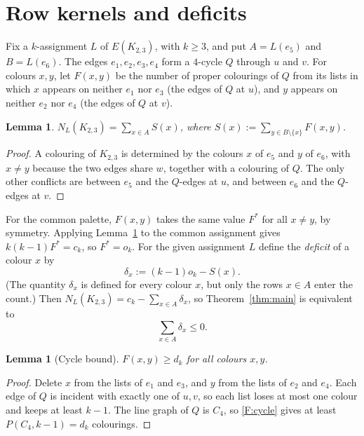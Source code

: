 \documentclass[11pt]{amsart}
\newtheorem{lemma}[theorem]{Lemma}
\theoremstyle{definition}
\theoremstyle{remark}
\newcommand{\1}{\mathbf 1}
\begin{document}
\section{Row kernels and deficits}\label{sec:reduction}

Fix a $k$-assignment $L$ of $E(K_{2,3})$, with $k\ge3$, and put $A=L(e_5)$ and $B=L(e_6)$. The edges
$e_1,e_2,e_3,e_4$ form a $4$-cycle $Q$ through $u$ and $v$. For colours $x,y$, let $F(x,y)$ be the
number of proper colourings of $Q$ from its lists in which $x$ appears on neither $e_1$ nor $e_3$ (the
edges of $Q$ at $u$), and $y$ appears on neither $e_2$ nor $e_4$ (the edges of $Q$ at $v$).

\begin{lemma}\label{lem:glue}
$N_L(K_{2,3})=\sum_{x\in A}S(x)$, where $S(x):=\sum_{y\in B\setminus\{x\}}F(x,y)$.
\end{lemma}
\begin{proof}
A colouring of $K_{2,3}$ is determined by the colours $x$ of $e_5$ and $y$ of $e_6$, with $x\neq y$
because the two edges share $w$, together with a colouring of $Q$. The only other conflicts are between
$e_5$ and the $Q$-edges at $u$, and between $e_6$ and the $Q$-edges at $v$.
\end{proof}

For the common palette, $F(x,y)$ takes the same value $F^*$ for all $x\ne y$, by symmetry. Applying
Lemma~\ref{lem:glue} to the common assignment gives $k(k-1)F^*=c_k$, so $F^*=o_k$. For the given
assignment $L$ define the \emph{deficit} of a colour $x$ by
\[
\delta_x:=(k-1)o_k-S(x).
\]
(The quantity $\delta_x$ is defined for every colour $x$, but only the rows
$x\in A$ enter the count.) Then $N_L(K_{2,3})=c_k-\sum_{x\in A}\delta_x$, so Theorem~\ref{thm:main} is equivalent to
\begin{equation}\label{eq:deficits}
\sum_{x\in A}\delta_x\le 0 .
\end{equation}

\begin{lemma}[Cycle bound]\label{lem:cyclebound}
$F(x,y)\ge d_k$ for all colours $x,y$.
\end{lemma}
\begin{proof}
Delete $x$ from the lists of $e_1$ and $e_3$, and $y$ from the lists of $e_2$ and $e_4$. Each edge of
$Q$ is incident with exactly one of $u,v$, so each list loses at most one colour and keeps at least
$k-1$. The line graph of $Q$ is $C_4$, so \ref{F:cycle} gives at least $P(C_4,k-1)=d_k$ colourings.
\end{proof}
\end{document}
